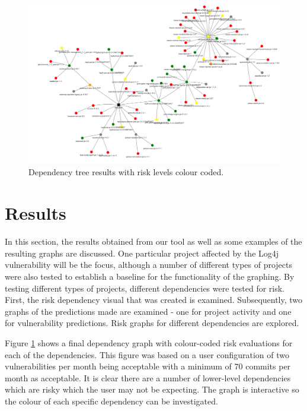 \documentclass[conference]{IEEEtran}
\begin{document}
\begin{figure}
    \centering
    \includegraphics[scale=0.5]{dependency.png}
    \caption{Dependency tree results with risk levels colour coded.} 
    \label{fig:tree}
\end{figure}

\section{Results}
In this section, the results obtained from our tool as well as some examples of the resulting graphs are discussed. One particular project \cite{noauthor_logging-log4j-sampleslog4j-server_nodate} affected by the Log4j vulnerability will be the focus, although a number of different types of projects were also tested to establish a baseline for the functionality of the graphing. By testing different types of projects, different dependencies were tested for risk. First, the risk dependency visual that was created is examined. Subsequently, two graphs of the predictions made are examined - one for project activity and one for vulnerability predictions. Risk graphs for different dependencies are explored. 

Figure \ref{fig:tree} shows a final dependency graph with colour-coded risk evaluations for each of the dependencies. This figure was based on a user configuration of two vulnerabilities per month being acceptable with a minimum of 70 commits per month as acceptable. It is clear there are a number of lower-level dependencies which are risky which the user may not be expecting. The graph is interactive so the colour of each specific dependency can be investigated. 
\end{document}
